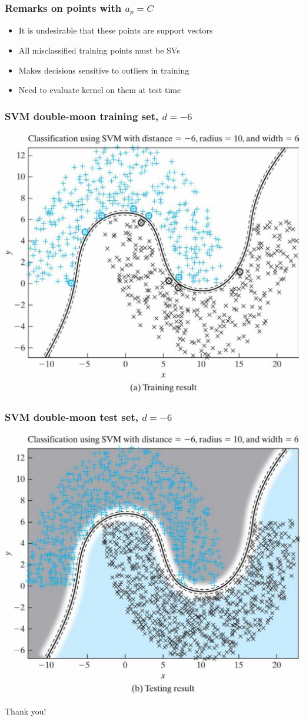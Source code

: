 \documentclass[12pt,notes,mathserif]{beamer}
\newcommand{\chuhao}{\fontsize{44.9pt}{\baselineskip}\selectfont}
\begin{document}
\begin{frame}[c]
\frametitle{Remarks on points with $a_p=C$}
\begin{itemize}
\item It is undesirable that these points are support vectors
\item All misclassified training points must be SVs
\item Makes decisions sensitive to outliers in training
\item Need to evaluate kernel on them at test time
\end{itemize}
\end{frame}



\begin{frame}[c]
\frametitle{SVM double-moon training set, $d=-6$}
\begin{center}
\includegraphics[width=0.7\linewidth]{fig10/lec1110.jpg}
\end{center}
\end{frame}


\begin{frame}[c]
\frametitle{SVM double-moon test set, $d=-6$}
\begin{center}
\includegraphics[width=0.7\linewidth]{fig10/lec1111.jpg}
\end{center}
\end{frame}



\begin{frame}
\begin{center}
\chuhao Thank you! %
\end{center}
\end{frame}
\end{document}

